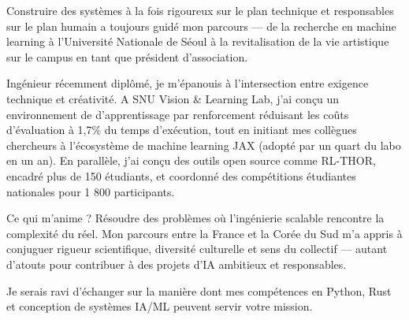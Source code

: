 
\newcommand{\Company}{}
\recipient{\phantom{.}}{}
\date{}
\makelettertitle{}
Construire des systèmes à la fois rigoureux sur le plan technique et responsables sur le plan humain a toujours guidé mon parcours — de la recherche en machine learning à l'Université Nationale de Séoul à la revitalisation de la vie artistique sur le campus en tant que président d'association.

Ingénieur récemment diplômé, je m'épanouis à l'intersection entre exigence technique et créativité. A SNU Vision \& Learning Lab, j'ai conçu un environnement de d'apprentissage par renforcement réduisant les coûts d'évaluation à 1,7\% du temps d'exécution, tout en initiant mes collègues chercheurs à l'écosystème de machine learning JAX (adopté par un quart du labo en un an). En parallèle, j'ai conçu des outils open source comme RL-THOR, encadré plus de 150 étudiants, et coordonné des compétitions étudiantes nationales pour 1 800 participants.

Ce qui m'anime ? Résoudre des problèmes où l'ingénierie scalable rencontre la complexité du réel. Mon parcours entre la France et la Corée du Sud m'a appris à conjuguer rigueur scientifique, diversité culturelle et sens du collectif — autant d'atouts pour contribuer à des projets d'IA ambitieux et responsables.

Je serais ravi d'échanger sur la manière dont mes compétences en Python, Rust et conception de systèmes IA/ML peuvent servir votre mission.

\makeletterclosing
